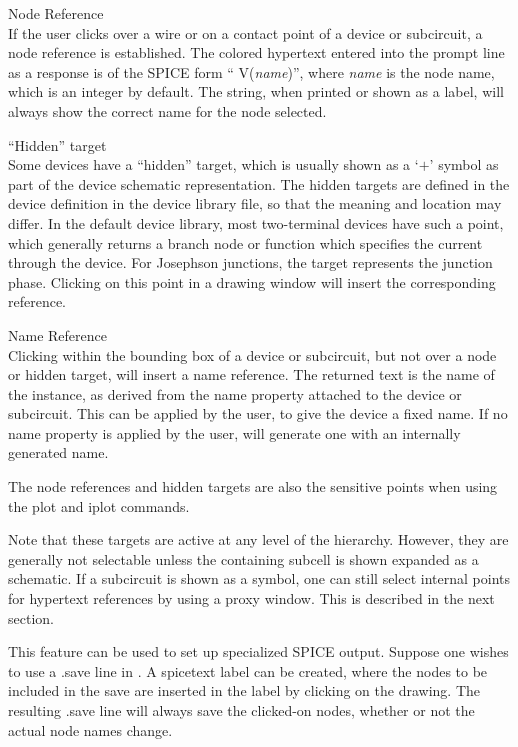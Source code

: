 \begin{description}
\item{Node Reference}\\
If the user clicks over a wire or on a contact point of a device or
subcircuit, a node reference is established.  The colored hypertext
entered into the prompt line as a response is of the SPICE form ``{\vt
V(}{\it name\/}{\vt )}'', where {\it name} is the node name, which is
an integer by default.  The string, when printed or shown as a label,
will always show the correct name for the node selected.

\item{``Hidden'' target}\\
Some devices have a ``hidden'' target, which is usually shown as a
`$+$' symbol as part of the device schematic representation.  The
hidden targets are defined in the device definition in the device
library file, so that the meaning and location may differ.  In the
default device library, most two-terminal devices have such a point,
which generally returns a branch node or function which specifies the
current through the device.  For Josephson junctions, the target
represents the junction phase.  Clicking on this point in a drawing
window will insert the corresponding reference.

\item{Name Reference}\\
Clicking within the bounding box of a device or subcircuit, but not
over a node or hidden target, will insert a name reference.  The
returned text is the name of the instance, as derived from the {\et
name} property attached to the device or subcircuit.  This can be
applied by the user, to give the device a fixed name.  If no {\et
name} property is applied by the user, {\Xic} will generate one with
an internally generated name.
\end{description}

The node references and hidden targets are also the sensitive points
when using the {\cb plot} and {\cb iplot} commands.

Note that these targets are active at any level of the hierarchy. 
However, they are generally not selectable unless the containing
subcell is shown expanded as a schematic.  If a subcircuit is shown as
a symbol, one can still select internal points for hypertext
references by using a proxy window.  This is described in the next
section.

This feature can be used to set up specialized SPICE output.  Suppose
one wishes to use a {\vt .save} line in {\WRspice}.  A {\vt spicetext}
label can be created, where the nodes to be included in the save are
inserted in the label by clicking on the drawing.  The resulting {\vt
.save} line will always save the clicked-on nodes, whether or not the
actual node names change.

